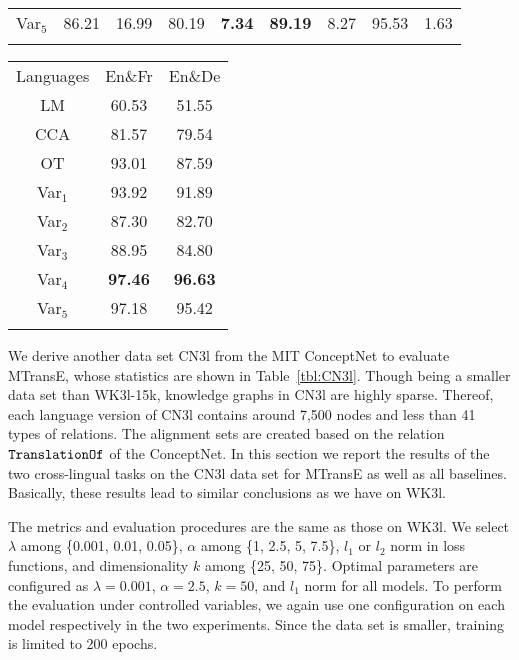 \documentclass{article}
\begin{document}
\begin{table*}[t!]
\begin{minipage}[t]{0.63\linewidth}
\begin{tabular}{c|cc|cc|cc|cc}
Var${_5}$&\multicolumn{1}{c}{86.21}&\multicolumn{1}{c|}{16.99}&\multicolumn{1}{c}{80.19}&\multicolumn{1}{c|}{\textbf{7.34}}&\multicolumn{1}{c}{\textbf{89.19}}&\multicolumn{1}{c|}{8.27}&\multicolumn{1}{c}{95.53}&\multicolumn{1}{c}{1.63}\\
\bhline
\end{tabular}
\end{minipage}
\hfill
\begin{minipage}[t]{0.3\linewidth}
\centering
\captionsetup{justification=centering}
\caption{Accuracy of triple-wise alignment verification (\%).}\label{tbl:alignmentcn}
\label{table:CN3l TWA}
{\scriptsize
\begin{tabular}{c|cc}
\bhline
Languages &  En\&Fr & En\&De\\
\bhline
LM&60.53&51.55\\
CCA&81.57&79.54\\
OT&93.01&87.59\\
\hline
Var${_1}$&93.92&91.89\\
Var${_2}$&87.30&82.70\\
Var${_3}$&88.95&84.80\\
Var${_4}$&\textbf{97.46}&\textbf{96.63}\\
Var${_5}$&97.18&95.42\\
\bhline
\end{tabular}
}
\end{minipage}
\vspace{-1em}
\end{table*}		


We derive another data set CN3l from the MIT ConceptNet to evaluate MTransE, whose statistics are shown in Table~\ref{tbl:CN3l}.
Though being a smaller data set than WK3l-15k, knowledge graphs in CN3l are highly sparse.
Thereof, each language version of CN3l contains around 7,500 nodes and less than 41 types of relations.
The alignment sets are created based on the relation ${\tt TranslationOf}$ of the ConceptNet.
In this section we report the results of the two cross-lingual tasks on the CN3l data set for MTransE as well as all baselines.
Basically, these results lead to similar conclusions as we have on WK3l.

 The metrics and evaluation procedures are the same as those on WK3l.
We select $\lambda$ among \{0.001, 0.01, 0.05\}, $\alpha$ among \{1, 2.5, 5, 7.5\}, $l_1$ or $l_2$ norm in loss functions, and dimensionality $k$ among \{25, 50, 75\}.
Optimal parameters are configured as $\lambda=0.001$, $\alpha=2.5$, $k=50$, and $l_1$ norm for all models.
To perform the evaluation under controlled variables, we again use one configuration on each model respectively in the two experiments.
Since the data set is smaller, training is limited to 200 epochs.
\end{document}
